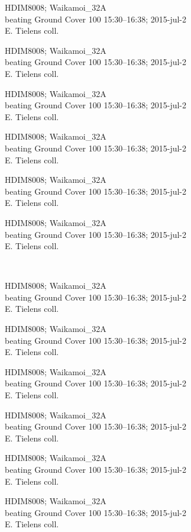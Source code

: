 \documentclass[2pt]{extarticle}
\begin{document}
\noindent
\parbox{0.16\textwidth}{\tiny \raggedright \rule[-0.3\baselineskip]{0pt}{10pt}HDIM8008; Waikamoi\_32A\\ beating Ground Cover 100 15:30--16:38; 2015-jul-2\\ E. Tielens coll.}
\parbox{0.16\textwidth}{\tiny \raggedright \rule[-0.3\baselineskip]{0pt}{10pt}HDIM8008; Waikamoi\_32A\\ beating Ground Cover 100 15:30--16:38; 2015-jul-2\\ E. Tielens coll.}
\parbox{0.16\textwidth}{\tiny \raggedright \rule[-0.3\baselineskip]{0pt}{10pt}HDIM8008; Waikamoi\_32A\\ beating Ground Cover 100 15:30--16:38; 2015-jul-2\\ E. Tielens coll.}
\parbox{0.16\textwidth}{\tiny \raggedright \rule[-0.3\baselineskip]{0pt}{10pt}HDIM8008; Waikamoi\_32A\\ beating Ground Cover 100 15:30--16:38; 2015-jul-2\\ E. Tielens coll.}
\parbox{0.16\textwidth}{\tiny \raggedright \rule[-0.3\baselineskip]{0pt}{10pt}HDIM8008; Waikamoi\_32A\\ beating Ground Cover 100 15:30--16:38; 2015-jul-2\\ E. Tielens coll.}
\parbox{0.16\textwidth}{\tiny \raggedright \rule[-0.3\baselineskip]{0pt}{10pt}HDIM8008; Waikamoi\_32A\\ beating Ground Cover 100 15:30--16:38; 2015-jul-2\\ E. Tielens coll.} \\ 
\vspace{0.001in} 

\noindent
\parbox{0.16\textwidth}{\tiny \raggedright \rule[-0.3\baselineskip]{0pt}{10pt}HDIM8008; Waikamoi\_32A\\ beating Ground Cover 100 15:30--16:38; 2015-jul-2\\ E. Tielens coll.}
\parbox{0.16\textwidth}{\tiny \raggedright \rule[-0.3\baselineskip]{0pt}{10pt}HDIM8008; Waikamoi\_32A\\ beating Ground Cover 100 15:30--16:38; 2015-jul-2\\ E. Tielens coll.}
\parbox{0.16\textwidth}{\tiny \raggedright \rule[-0.3\baselineskip]{0pt}{10pt}HDIM8008; Waikamoi\_32A\\ beating Ground Cover 100 15:30--16:38; 2015-jul-2\\ E. Tielens coll.}
\parbox{0.16\textwidth}{\tiny \raggedright \rule[-0.3\baselineskip]{0pt}{10pt}HDIM8008; Waikamoi\_32A\\ beating Ground Cover 100 15:30--16:38; 2015-jul-2\\ E. Tielens coll.}
\parbox{0.16\textwidth}{\tiny \raggedright \rule[-0.3\baselineskip]{0pt}{10pt}HDIM8008; Waikamoi\_32A\\ beating Ground Cover 100 15:30--16:38; 2015-jul-2\\ E. Tielens coll.}
\parbox{0.16\textwidth}{\tiny \raggedright \rule[-0.3\baselineskip]{0pt}{10pt}HDIM8008; Waikamoi\_32A\\ beating Ground Cover 100 15:30--16:38; 2015-jul-2\\ E. Tielens coll.} \\ 
\vspace{0.001in} 
\end{document}
